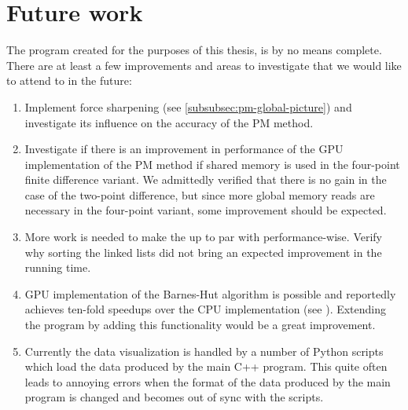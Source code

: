 \section{Future work}
The program created for the purposes of this thesis, is by no means complete.
There are at least a few improvements and areas to investigate that we would like to attend to in the future:
\begin{enumerate}
      \item Implement force sharpening (see \autoref{subsubsec:pm-global-picture}) and investigate its influence on the accuracy of the PM method.
      \item Investigate if there is an improvement in performance of the GPU implementation of the PM method if shared memory is used in the four-point finite difference variant.
            We admittedly verified that there is no gain in the case of the two-point difference, but since more global memory reads are necessary in the four-point variant, some improvement should be expected.
      \item More work is needed to make the \PThreeM{} up to par with performance-wise. Verify why sorting the linked lists did not bring an expected improvement in the running time.
      \item GPU implementation of the Barnes-Hut algorithm is possible  and reportedly achieves ten-fold speedups over the CPU implementation (see \cite{BURTSCHER201175}).
            Extending the program by adding this functionality would be a great improvement.
      \item Currently the data visualization is handled by a number of Python scripts which load the data produced by the main C++ program.
            This quite often leads to annoying errors when the format of the data produced by the main program is changed and becomes out of sync with the scripts.
\end{enumerate}